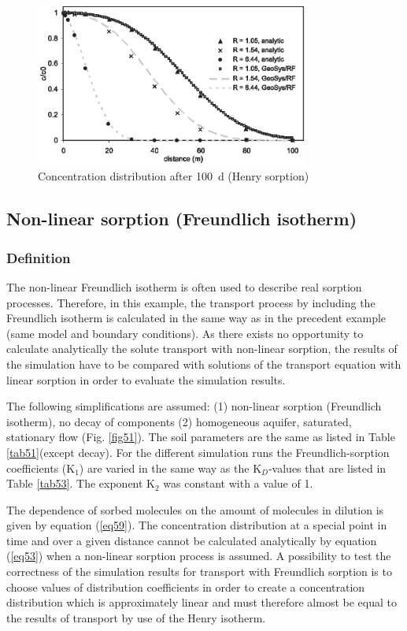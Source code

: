 \begin{figure}[htbp]
\centering
\includegraphics[width=0.8\textwidth]{PART_II/C/fig53.eps}
\caption{Concentration distribution after 100~d (Henry sorption)}
\label{fig53}
\end{figure}

\subsection{Non-linear sorption (Freundlich isotherm)}

\subsubsection{Definition}

The non-linear Freundlich isotherm is often used to describe real sorption processes. Therefore, in this example, the transport process by including the Freundlich isotherm is calculated in the same way as in the precedent example (same model and boundary conditions). As there exists no opportunity to calculate analytically the solute transport with non-linear sorption, the results of the simulation have to be compared with solutions of the transport equation with linear sorption in order to evaluate the simulation results.

The following simplifications are assumed: (1) non-linear sorption (Freundlich isotherm), no decay of components (2) homogeneous aquifer, saturated, stationary flow (Fig. \ref{fig51}).
%
The soil parameters are the same as listed in Table \ref{tab51}(except decay). For the different simulation runs the Freundlich-sorption coefficients (K$_1$) are varied in the same way as the K$_D$-values that are listed in Table \ref{tab53}. The exponent K$_2$ was constant with a value of 1.

The dependence of sorbed molecules on the amount of molecules in dilution is given by equation (\ref{eq59}). The concentration distribution at a special point in time and over a given distance cannot be calculated analytically by equation (\ref{eq53}) when a non-linear sorption process is assumed. A possibility to test the correctness of the simulation results for transport with Freundlich sorption is to choose values of distribution coefficients in order to create a concentration distribution which is approximately linear and must therefore almost be equal to the results of transport by use of the Henry isotherm.

